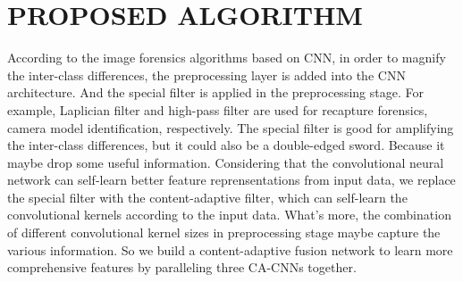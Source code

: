 \documentclass{article}
\begin{document}
\section{PROPOSED ALGORITHM}
\label{sec:pagestyle}
 According to the image forensics algorithms based on CNN, in order to magnify the inter-class differences, the preprocessing layer is added into the CNN architecture. And the special filter is applied in the preprocessing stage. For example, Laplician filter and high-pass filter are used for recapture forensics, camera model identification, respectively. The special filter is good for amplifying the inter-class differences, but it could also be a double-edged sword. Because it maybe drop some useful information. Considering that the convolutional neural network can self-learn better feature reprensentations from input data, we replace the special filter with the content-adaptive filter, which can self-learn the convolutional kernels according to the input data. What's more, the combination of different convolutional kernel sizes in preprocessing stage maybe capture the various information. So we build a content-adaptive fusion network to learn more comprehensive features by paralleling three CA-CNNs together. 
\end{document}
